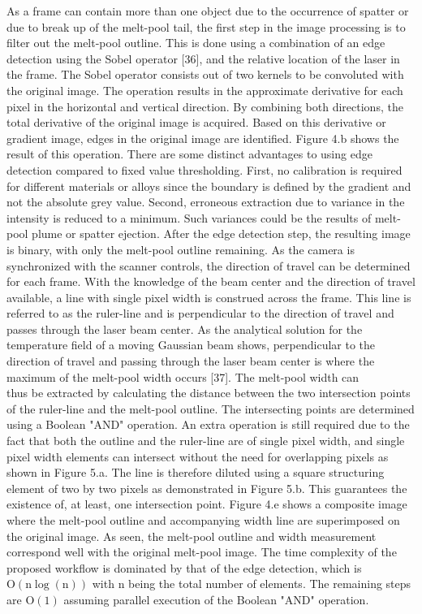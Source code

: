 \documentclass[10pt]{article}
\begin{document}
As a frame can contain more than one object due to the occurrence of spatter or due to break up of the melt-pool tail, the first step in the image processing is to filter out the melt-pool outline. This is done using a combination of an edge detection using the Sobel operator [36], and the relative location of the laser in the frame. The Sobel operator consists out of two kernels to be convoluted with the original image. The operation results in the approximate derivative for each pixel in the horizontal and vertical direction. By combining both directions, the total derivative of the original image is acquired. Based on this derivative or gradient image, edges in the original image are identified. Figure 4.b shows the result of this operation. There are some distinct advantages to using edge detection compared to fixed value thresholding. First, no calibration is required for different materials or alloys since the boundary is defined by the gradient and not the absolute grey value. Second, erroneous extraction due to variance in the intensity is reduced to a minimum. Such variances could be the results of melt-pool plume or spatter ejection. After the edge detection step, the resulting image is binary, with only the melt-pool outline remaining. As the camera is synchronized with the scanner controls, the direction of travel can be determined for each frame. With the knowledge of the beam center and the direction of travel available, a line with single pixel width is construed across the frame. This line is referred to as the ruler-line and is perpendicular to the direction of travel and passes through the laser beam center. As the analytical solution for the temperature field of a moving Gaussian beam shows, perpendicular to the direction of travel and passing through the laser beam center is where the maximum of the melt-pool width occurs [37]. The melt-pool width can\\
thus be extracted by calculating the distance between the two intersection points of the ruler-line and the melt-pool outline. The intersecting points are determined using a Boolean "AND" operation. An extra operation is still required due to the fact that both the outline and the ruler-line are of single pixel width, and single pixel width elements can intersect without the need for overlapping pixels as shown in Figure 5.a. The line is therefore diluted using a square structuring element of two by two pixels as demonstrated in Figure 5.b. This guarantees the existence of, at least, one intersection point. Figure 4.e shows a composite image where the melt-pool outline and accompanying width line are superimposed on the original image. As seen, the melt-pool outline and width measurement correspond well with the original melt-pool image. The time complexity of the proposed workflow is dominated by that of the edge detection, which is $\mathrm{O}(\mathrm{n} \log (\mathrm{n}))$ with $\mathrm{n}$ being the total number of elements. The remaining steps are $\mathrm{O}(1)$ assuming parallel execution of the Boolean "AND" operation.
\end{document}
